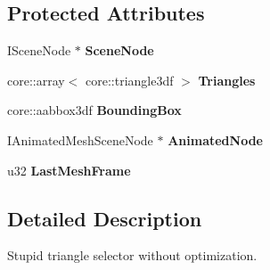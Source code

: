 \subsection*{Protected Attributes}
\begin{DoxyCompactItemize}
\item 
\hypertarget{classirr_1_1scene_1_1_c_triangle_selector_ae2bc6e2208461973b66bcf445776bbeb}{I\-Scene\-Node $\ast$ {\bfseries Scene\-Node}}\label{classirr_1_1scene_1_1_c_triangle_selector_ae2bc6e2208461973b66bcf445776bbeb}

\item 
\hypertarget{classirr_1_1scene_1_1_c_triangle_selector_a56d735af33d111829ffaf8f4f1fe9ca4}{core\-::array$<$ core\-::triangle3df $>$ {\bfseries Triangles}}\label{classirr_1_1scene_1_1_c_triangle_selector_a56d735af33d111829ffaf8f4f1fe9ca4}

\item 
\hypertarget{classirr_1_1scene_1_1_c_triangle_selector_a79e66fc8b5825d8f6905881b1a7bcd81}{core\-::aabbox3df {\bfseries Bounding\-Box}}\label{classirr_1_1scene_1_1_c_triangle_selector_a79e66fc8b5825d8f6905881b1a7bcd81}

\item 
\hypertarget{classirr_1_1scene_1_1_c_triangle_selector_a915ba6efaf027919ccff228d683fa5b9}{I\-Animated\-Mesh\-Scene\-Node $\ast$ {\bfseries Animated\-Node}}\label{classirr_1_1scene_1_1_c_triangle_selector_a915ba6efaf027919ccff228d683fa5b9}

\item 
\hypertarget{classirr_1_1scene_1_1_c_triangle_selector_a1a4470d0cc49b7ca8b1289ffde2b26e1}{u32 {\bfseries Last\-Mesh\-Frame}}\label{classirr_1_1scene_1_1_c_triangle_selector_a1a4470d0cc49b7ca8b1289ffde2b26e1}

\end{DoxyCompactItemize}


\subsection{Detailed Description}
Stupid triangle selector without optimization. 

